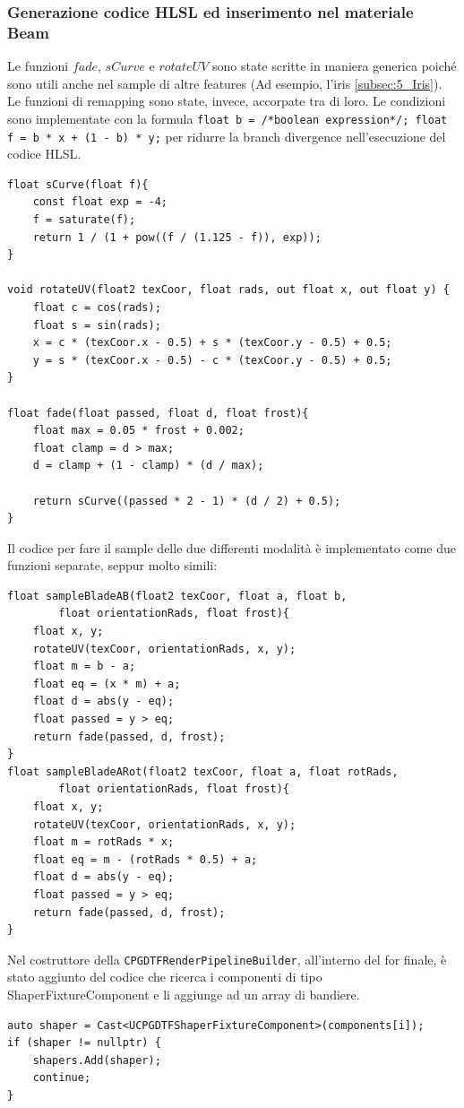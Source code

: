 \documentclass[main.tex]{subfiles}
\begin{document}
\subsubsection{Generazione codice HLSL ed inserimento nel materiale Beam}\label{subsec:5_1_ShaperHlsl}
\lstset{language=glsl}
Le funzioni $fade$, $sCurve$ e $rotateUV$ sono state scritte in maniera generica poiché sono utili anche nel sample di altre features (Ad esempio, l'iris \ref{subsec:5_Iris}). Le funzioni di remapping sono state, invece, accorpate tra di loro. Le condizioni sono implementate con la formula \lstinline{float b = /*boolean expression*/; float f = b * x + (1 - b) * y;} per ridurre la branch divergence nell'esecuzione del codice HLSL.
\begin{lstlisting}
float sCurve(float f){
	const float exp = -4;
	f = saturate(f);
	return 1 / (1 + pow((f / (1.125 - f)), exp));
}

void rotateUV(float2 texCoor, float rads, out float x, out float y) {
	float c = cos(rads);
	float s = sin(rads);
	x = c * (texCoor.x - 0.5) + s * (texCoor.y - 0.5) + 0.5;
	y = s * (texCoor.x - 0.5) - c * (texCoor.y - 0.5) + 0.5;
}

float fade(float passed, float d, float frost){
	float max = 0.05 * frost + 0.002;
	float clamp = d > max;
	d = clamp + (1 - clamp) * (d / max);

	return sCurve((passed * 2 - 1) * (d / 2) + 0.5);
}
\end{lstlisting}

Il codice per fare il sample delle due differenti modalità è implementato come due funzioni separate, seppur molto simili:
\begin{lstlisting}
float sampleBladeAB(float2 texCoor, float a, float b,
		float orientationRads, float frost){
	float x, y;
	rotateUV(texCoor, orientationRads, x, y);
	float m = b - a;
	float eq = (x * m) + a;
	float d = abs(y - eq);
	float passed = y > eq;
	return fade(passed, d, frost);
}
float sampleBladeARot(float2 texCoor, float a, float rotRads,
		float orientationRads, float frost){
	float x, y;
	rotateUV(texCoor, orientationRads, x, y);
	float m = rotRads * x;
	float eq = m - (rotRads * 0.5) + a;
	float d = abs(y - eq);
	float passed = y > eq;
	return fade(passed, d, frost);
}
\end{lstlisting}


Nel costruttore della \lstinline{CPGDTFRenderPipelineBuilder}, all'interno del for finale, è stato aggiunto del codice che ricerca i componenti di tipo ShaperFixtureComponent e li aggiunge ad un array di bandiere.
\lstset{language=UEcpp}
\begin{lstlisting}
auto shaper = Cast<UCPGDTFShaperFixtureComponent>(components[i]);
if (shaper != nullptr) {
    shapers.Add(shaper);
    continue;
}
\end{lstlisting}
\end{document}
